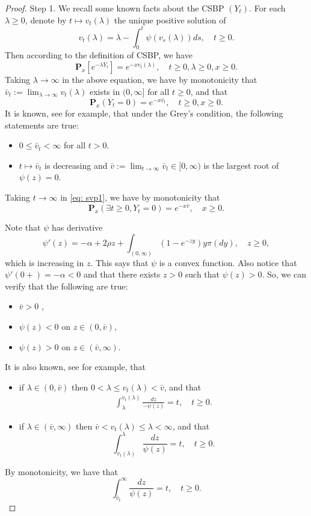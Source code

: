 \documentclass[12pt,a4paper]{amsart}
\theoremstyle{plain}
\theoremstyle{definition}
\numberwithin{equation}{section}
\begin{document}
\begin{proof}
    Step 1. We recall some known facts about the CSBP $(Y_t)$.
    For each $\lambda \geq 0$, denote by $t\mapsto v_t(\lambda)$ the unique positive solution of
\[
    v_t(\lambda)
    = \lambda - \int_0^t \psi(v_s(\lambda))ds,\quad t\geq 0.
\]
    Then according to the definition of CSBP, we have
\[
    \mathbf P_x[e^{-\lambda Y_t}] = e^{-xv_t(\lambda)}, \quad t\geq 0, \lambda \geq 0, x\geq 0.
\]
    Taking $\lambda \to \infty$ in the above equation, we have by monotonicity that $\bar v_t:= \lim_{\lambda \to \infty}v_t(\lambda)$ exists in $(0,\infty]$ for all $t\geq 0$, and that
\begin{equation}
\label{eq: svp1}
    \mathbf P_x(Y_t = 0)=e^{-x\bar v_t}, \quad t\geq 0, x\ge 0.
\end{equation}
    It is known, see \cite[Theorem 3.5-3.8]{Li2011Measure-valued} for example, that under the Grey's condition, the following statements are true:
\begin{itemize}
\item
    $0\leq \bar v_t < \infty$ for all $t>0$.
\item
    $t\mapsto \bar v_t$ is decreasing and $\bar v:= \lim_{t\to \infty} \bar v_t \in [0,\infty)$ is the largest root of $\psi(z) = 0$.
\end{itemize}
    Taking $t \to \infty$ in \eqref{eq: svp1}, we have by monotonicity that
\[
    \mathbf P_x(\exists t \geq 0, Y_t = 0)
    = e^{-x\bar v}, \quad x\geq 0.
\]

    Note that $\psi$ has derivative
\[
    \psi'(z)
    = -\alpha + 2\rho z + \int_{(0,\infty)}(1-e^{-zy})y\pi(dy),\quad z\geq 0,
\]
    which is increasing in $z$.
    This says that $\psi$ is a convex function.
    Also notice that $\psi'(0+)=-\alpha <0$ and that there exists $z>0$ such that $\psi(z)>0$.
    So, we can verify that the following are true:
\begin{itemize}
\item
    $\bar v > 0$ ,
\item
    $\psi(z) < 0$ on $z\in (0,\bar v)$,
\item
    $\psi(z) > 0 $ on $z\in (\bar v, \infty)$.
\end{itemize}
    It is also known, see \cite[Proposition 3.3]{Li2011Measure-valued} for example, that
\begin{itemize}
\item
    if $\lambda \in (0,\bar v)$ then $0<\lambda \leq v_t(\lambda)<\bar v $, and that
\begin{align}
\label{CSBP: int}
    \int_{\lambda}^{v_t(\lambda)} \frac{dz}{-\psi(z)} = t, \quad t\geq 0.
\end{align}
\item
    if $\lambda \in (\bar v, \infty)$ then $\bar v < v_t(\lambda)\leq \lambda< \infty $, and that
\[
  \int_{v_t(\lambda)}^\lambda\frac{dz}{\psi(z)} = t, \quad t\geq 0.
\]
\end{itemize}
    By monotonicity, we have that
\begin{equation}
\label{eq:svp2}
    \int_{\bar v_t}^\infty \frac{dz}{\psi(z)} = t, \quad t\geq 0.
\end{equation}


\end{proof}
\end{document}

